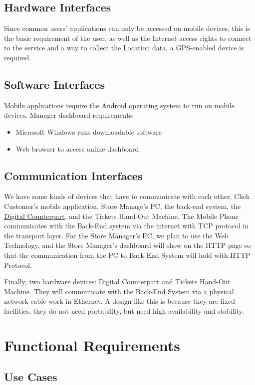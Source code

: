 \documentclass[a4paper,12pt]{report}
\begin{document}
\subsection{Hardware Interfaces}
Since common users’ applications can only be accessed on mobile devices, this is the basic requirement of the user, as well as the Internet access rights to connect to the service and
a way to collect the Location data, a GPS-enabled device is required.

\subsection{Software  Interfaces}
Mobile applications require the Android operating system to run on mobile devices.
Manager dashboard requirements:
\begin{itemize}
	\item Microsoft Windows runs downloadable software
	\item Web browser to access online dashboard
\end{itemize}

\subsection{Communication Interfaces}

We have some kinds of devices that have to communicate with each other, Click Customer's mobile application, Store Manage's PC, the back-end system, the \hyperref[Definitions]{Digital Counterpart}, and the Tickets Hand-Out Machine. The Mobile Phone communicates with the Back-End system via the internet with TCP protocol in the transport layer. For the Store Manager's PC, we plan to use the Web Technology, and the Store Manager's dashboard will show on the HTTP page so that the communication from the PC to Back-End System will hold with HTTP Protocol.

Finally, two hardware devices: Digital Counterpart and Tickets Hand-Out Machine. They will communicate with the Back-End System via a physical network cable work in Ethernet. A design like this is because they are fixed facilities, they do not need portability, but need high availability and stability.


\section{Functional Requirements}
\subsection{Use Cases}
\end{document}
